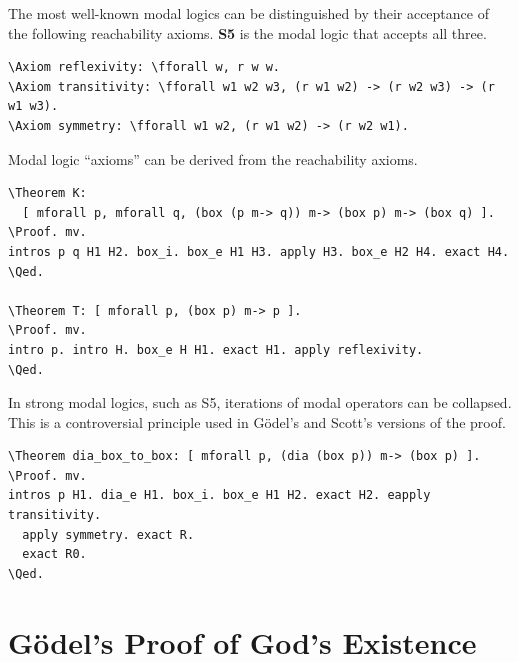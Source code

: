 \documentclass{llncs}
\newcommand{\red}[1]{\textcolor[rgb]{1,0,0}{#1}}
\newcommand{\blue}[1]{\textcolor[rgb]{0,0,1}{#1}}
\newcommand{\Axiom}{\red{Axiom}}
\newcommand{\Theorem}{\red{Theorem}}
\newcommand{\fforall}{\blue{forall}}
\newcommand{\Proof}{\blue{Proof}}
\newcommand{\Qed}{\blue{Qed}}
\begin{document}
\noindent
The most well-known modal logics can be distinguished by their acceptance of the following reachability axioms. \textbf{S5} is the modal logic that accepts all three.

\begin{Verbatim}[commandchars=\\\{\},fontsize=\verbsize]
\Axiom reflexivity: \fforall w, r w w.
\Axiom transitivity: \fforall w1 w2 w3, (r w1 w2) -> (r w2 w3) -> (r w1 w3).
\Axiom symmetry: \fforall w1 w2, (r w1 w2) -> (r w2 w1).
\end{Verbatim}

\noindent
Modal logic ``axioms'' can be derived from the reachability axioms.

\begin{Verbatim}[commandchars=\\\{\},fontsize=\verbsize]
\Theorem K: 
  [ mforall p, mforall q, (box (p m-> q)) m-> (box p) m-> (box q) ].
\Proof. mv. 
intros p q H1 H2. box_i. box_e H1 H3. apply H3. box_e H2 H4. exact H4. 
\Qed.

\Theorem T: [ mforall p, (box p) m-> p ].
\Proof. mv. 
intro p. intro H. box_e H H1. exact H1. apply reflexivity. 
\Qed.
\end{Verbatim}

\noindent
In strong modal logics, such as S5, iterations of modal operators can be collapsed. This is a controversial principle used in G\"odel's and Scott's versions of the proof.

\begin{Verbatim}[commandchars=\\\{\},fontsize=\verbsize]
\Theorem dia_box_to_box: [ mforall p, (dia (box p)) m-> (box p) ].
\Proof. mv. 
intros p H1. dia_e H1. box_i. box_e H1 H2. exact H2. eapply transitivity. 
  apply symmetry. exact R. 
  exact R0.
\Qed.
\end{Verbatim}


\section{G\"odel's Proof of God's Existence}
\label{sec:proof}
\end{document}
